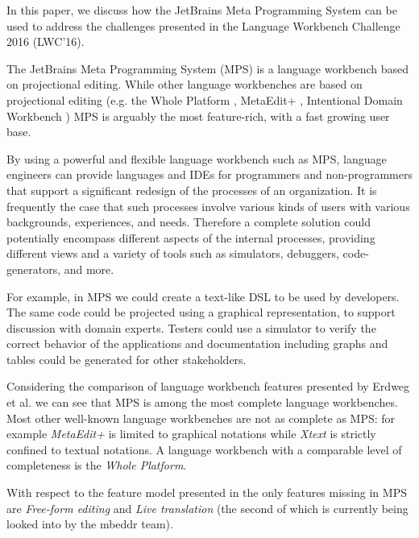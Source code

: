 \documentclass[preprint,numbers,10pt]{sigplanconf}
\newcommand\markus[1]{\textcolor{red}{MARKUS: {#1}}}
\begin{document}
In this paper, we discuss how the JetBrains Meta Programming System can be used to address the challenges presented in the Language Workbench
Challenge 2016 (LWC'16).

The JetBrains Meta Programming System (MPS) is a language workbench based
on projectional editing. While other language workbenches are based on
projectional editing (e.g. the Whole Platform \cite{solmi2005whole}, MetaEdit+
\cite{Tolvanen2006}, Intentional Domain Workbench \cite{Simonyi2006}) MPS is
arguably the most feature-rich, with a fast growing user base.

By using a powerful and flexible language workbench such as MPS, language
engineers can provide languages and IDEs for programmers and non-programmers that support a significant redesign of the processes of an organization.
It is frequently the case that such processes involve various kinds of users with various backgrounds, experiences, and needs. Therefore a complete solution
could potentially encompass different aspects of the internal processes,
providing different views and a variety of tools such as simulators, debuggers,
code-generators, and more.

For example, in MPS we could create a text-like DSL to be used by developers. The same code could be projected using a graphical representation, to support discussion with domain experts. Testers could use a simulator to verify the correct behavior of the applications and documentation including graphs and tables could be generated for other stakeholders.


Considering the comparison of language workbench features presented by Erdweg et al.
\cite{erdweg2015evaluating} we can see that MPS is among the most complete
language workbenches. Most other well-known language workbenches are not as complete as MPS: for example \emph{MetaEdit+} is limited to graphical notations while \emph{Xtext} \cite{Eysholdt2010} is strictly confined to textual notations. A language workbench with a comparable level of completeness is the \emph{Whole
Platform}.

With respect to the feature model presented in \cite{erdweg2015evaluating} the
only features missing in MPS are \emph{Free-form editing} and \emph{Live
translation} (the second of which is currently being looked into by the mbeddr team).
\end{document}
